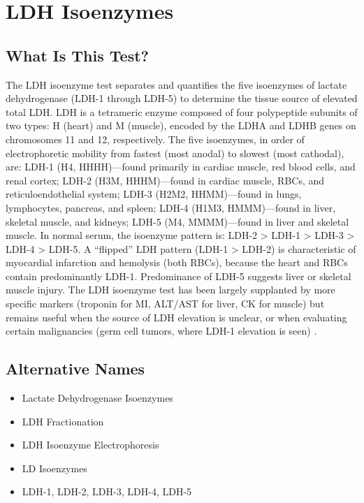 \chapter{LDH Isoenzymes}

\section*{What Is This Test?}
The LDH isoenzyme test separates and quantifies the five isoenzymes of lactate dehydrogenase (LDH-1 through LDH-5) to determine the tissue source of elevated total LDH. LDH is a tetrameric enzyme composed of four polypeptide subunits of two types: H (heart) and M (muscle), encoded by the LDHA and LDHB genes on chromosomes 11 and 12, respectively. The five isoenzymes, in order of electrophoretic mobility from fastest (most anodal) to slowest (most cathodal), are: LDH-1 (H4, HHHH)---found primarily in cardiac muscle, red blood cells, and renal cortex; LDH-2 (H3M, HHHM)---found in cardiac muscle, RBCs, and reticuloendothelial system; LDH-3 (H2M2, HHMM)---found in lungs, lymphocytes, pancreas, and spleen; LDH-4 (H1M3, HMMM)---found in liver, skeletal muscle, and kidneys; LDH-5 (M4, MMMM)---found in liver and skeletal muscle. In normal serum, the isoenzyme pattern is: LDH-2 > LDH-1 > LDH-3 > LDH-4 > LDH-5. A ``flipped'' LDH pattern (LDH-1 > LDH-2) is characteristic of myocardial infarction and hemolysis (both RBCs), because the heart and RBCs contain predominantly LDH-1. Predominance of LDH-5 suggests liver or skeletal muscle injury. The LDH isoenzyme test has been largely supplanted by more specific markers (troponin for MI, ALT/AST for liver, CK for muscle) but remains useful when the source of LDH elevation is unclear, or when evaluating certain malignancies (germ cell tumors, where LDH-1 elevation is seen) \cite{tietz2023textbook}.

\section*{Alternative Names}
\begin{itemize}
  \item Lactate Dehydrogenase Isoenzymes
  \item LDH Fractionation
  \item LDH Isoenzyme Electrophoresis
  \item LD Isoenzymes
  \item LDH-1, LDH-2, LDH-3, LDH-4, LDH-5
\end{itemize}
